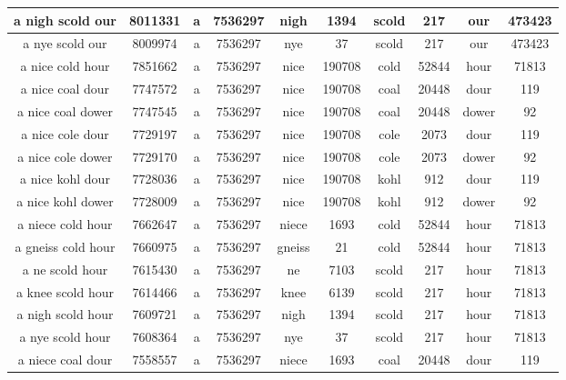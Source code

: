 \begin {longtable}{ cc|cccccccc }
 a nigh scold our   &  8011331  &   a   &  7536297  &   nigh   &  1394  &   scold   &  217  &   our   &  473423   \\ \hline
 a nye scold our   &  8009974  &   a   &  7536297  &   nye   &  37  &   scold   &  217  &   our   &  473423   \\ \hline
 a nice cold hour   &  7851662  &   a   &  7536297  &   nice   &  190708  &   cold   &  52844  &   hour   &  71813   \\ \hline
 a nice coal dour   &  7747572  &   a   &  7536297  &   nice   &  190708  &   coal   &  20448  &   dour   &  119   \\ \hline
 a nice coal dower   &  7747545  &   a   &  7536297  &   nice   &  190708  &   coal   &  20448  &   dower   &  92   \\ \hline
 a nice cole dour   &  7729197  &   a   &  7536297  &   nice   &  190708  &   cole   &  2073  &   dour   &  119   \\ \hline
 a nice cole dower   &  7729170  &   a   &  7536297  &   nice   &  190708  &   cole   &  2073  &   dower   &  92   \\ \hline
 a nice kohl dour   &  7728036  &   a   &  7536297  &   nice   &  190708  &   kohl   &  912  &   dour   &  119   \\ \hline
 a nice kohl dower   &  7728009  &   a   &  7536297  &   nice   &  190708  &   kohl   &  912  &   dower   &  92   \\ \hline
 a niece cold hour   &  7662647  &   a   &  7536297  &   niece   &  1693  &   cold   &  52844  &   hour   &  71813   \\ \hline
 a gneiss cold hour   &  7660975  &   a   &  7536297  &   gneiss   &  21  &   cold   &  52844  &   hour   &  71813   \\ \hline
 a ne scold hour   &  7615430  &   a   &  7536297  &   ne   &  7103  &   scold   &  217  &   hour   &  71813   \\ \hline
 a knee scold hour   &  7614466  &   a   &  7536297  &   knee   &  6139  &   scold   &  217  &   hour   &  71813   \\ \hline
 a nigh scold hour   &  7609721  &   a   &  7536297  &   nigh   &  1394  &   scold   &  217  &   hour   &  71813   \\ \hline
 a nye scold hour   &  7608364  &   a   &  7536297  &   nye   &  37  &   scold   &  217  &   hour   &  71813   \\ \hline
 a niece coal dour   &  7558557  &   a   &  7536297  &   niece   &  1693  &   coal   &  20448  &   dour   &  119   \\ \hline

\end{longtable}
